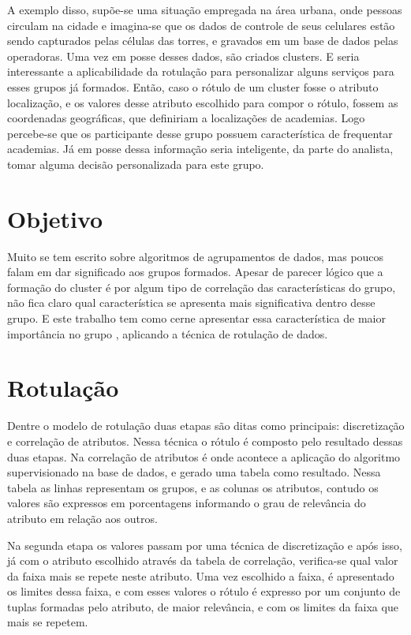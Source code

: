 A exemplo disso, supõe-se uma situação empregada na área urbana, onde pessoas circulam na cidade e imagina-se que os dados de controle de seus celulares estão sendo capturados pelas células das torres, e gravados em um base de dados pelas operadoras. Uma vez em posse desses dados, são criados clusters. E seria interessante a aplicabilidade da rotulação para personalizar alguns serviços para esses grupos já formados. Então, caso o rótulo de um cluster fosse o atributo localização, e os valores  desse atributo escolhido para compor o rótulo, fossem as coordenadas geográficas, que definiriam a localizações de academias. Logo percebe-se que os participante desse grupo possuem característica de frequentar academias. Já em posse dessa informação  seria inteligente, da parte do analista, tomar alguma decisão personalizada para este grupo.

\section*{Objetivo}
Muito se tem escrito sobre algoritmos de agrupamentos de dados, mas poucos falam em dar significado aos grupos formados. Apesar de parecer  lógico que a formação do cluster é por algum tipo de correlação das características do grupo, não fica claro qual característica se apresenta mais significativa dentro desse grupo. E este trabalho tem como cerne apresentar essa característica de maior importância no grupo , aplicando a técnica de rotulação de dados.

\section*{Rotulação}
Dentre o modelo de rotulação duas etapas são ditas como principais: discretização e correlação de atributos. Nessa técnica o rótulo é composto pelo resultado dessas duas etapas. Na correlação de atributos é onde acontece a aplicação do algoritmo supervisionado na base de dados, e gerado uma tabela como resultado. Nessa tabela as linhas representam os grupos, e as colunas os atributos, contudo os valores são expressos em porcentagens informando o grau de relevância do atributo em relação aos outros. 

Na segunda etapa os valores passam por uma técnica de discretização e após isso, já com o atributo escolhido através da tabela de correlação, verifica-se qual valor da faixa mais se repete neste atributo. Uma vez escolhido a faixa, é apresentado os limites dessa faixa, e com esses valores o rótulo é expresso por um conjunto de tuplas formadas pelo atributo, de maior relevância, e com os limites da faixa que mais se repetem. 

